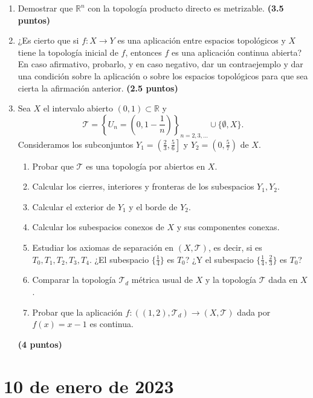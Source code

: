 \begin{enumerate}
    \item Demostrar que $\mathbb{R}^n$ con la topología producto directo es metrizable.
    \hfill \textbf{(3.5 puntos)}

    \item ¿Es cierto que si $f : X \to Y$ es una aplicación entre espacios topológicos y $X$ tiene la topología inicial de $f$, entonces $f$ es una aplicación continua abierta? En caso afirmativo, probarlo, y en caso negativo, dar un contraejemplo y dar una condición sobre la aplicación o sobre los espacios topológicos para que sea cierta la afirmación anterior.
    \hfill \textbf{(2.5 puntos)}

    \item Sea $X$ el intervalo abierto $(0, 1) \subset \mathbb{R}$ y
    \[
        \mathcal{T} = \left\{ U_n = \left(0, 1 - \frac{1}{n}\right) \right\}_{n=2, 3, \dots} \cup \{\emptyset, X\}.
    \]
    Consideramos los subconjuntos $Y_1 = \left(\frac{2}{3}, \frac{5}{6}\right]$ y $Y_2 = \left(0, \frac{5}{7}\right)$ de $X$.
    \begin{enumerate}
        \item Probar que $\mathcal{T}$ es una topología por abiertos en $X$.
        \item Calcular los cierres, interiores y fronteras de los subespacios $Y_1, Y_2$.
        \item Calcular el exterior de $Y_1$ y el borde de $Y_2$.
        \item Calcular los subespacios conexos de $X$ y sus componentes conexas.
        \item Estudiar los axiomas de separación en $(X, \mathcal{T})$, es decir, si es $T_0, T_1, T_2, T_3, T_4$. ¿El subespacio $\{\frac{1}{4}\}$ es $T_0$? ¿Y el subespacio $\{\frac{1}{4}, \frac{2}{3}\}$ es $T_0$?
        \item Comparar la topología $\mathcal{T}_d$ métrica usual de $X$ y la topología $\mathcal{T}$ dada en $X$.
        \item Probar que la aplicación $f : ((1, 2), \mathcal{T}_d) \to (X, \mathcal{T})$ dada por $f(x) = x - 1$ es continua.
    \end{enumerate}
    \hfill \textbf{(4 puntos)}
\end{enumerate}

\section{10 de enero de 2023}

